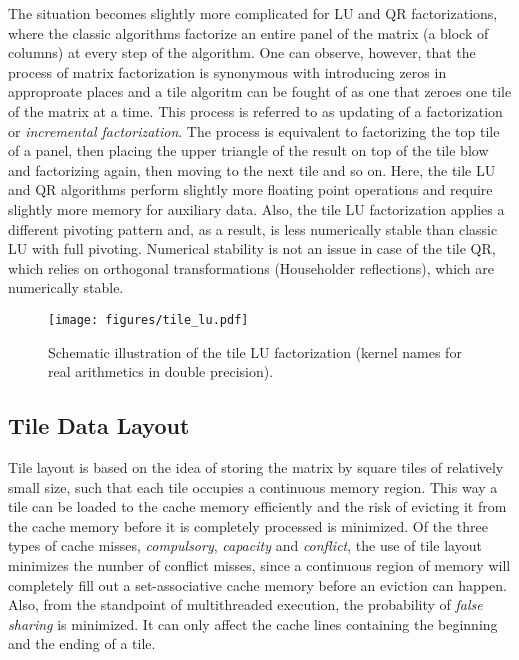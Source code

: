 The situation becomes slightly more complicated for LU and QR factorizations, where the
classic algorithms factorize an entire panel of the matrix (a block of columns) at every
step of the algorithm.
One can observe, however, that the process of matrix factorization is synonymous with introducing
zeros in approproate places and a tile algoritm can be fought of as one that zeroes one tile of
the matrix at a time.
This process is referred to as updating of a factorization or {\em incremental factorization}.
The process is equivalent to factorizing the top tile of a panel, then placing the upper
triangle of the result on top of the tile blow and factorizing again, then moving to the
next tile and so on.
Here, the tile LU and QR algorithms perform slightly more floating point operations and
require slightly more memory for auxiliary data.
Also, the tile LU factorization applies a different pivoting pattern and, as a result,
is less numerically stable than classic LU with full pivoting.
Numerical stability is not an issue in case of the tile QR, which relies on orthogonal
transformations (Householder reflections), which are numerically stable.

\begin{figure}[h!]
\centering
\texttt{[image: figures/tile\_lu.pdf]}
\caption{Schematic illustration of the tile LU factorization
         (kernel names for real arithmetics in double precision).}
\label{fig:tile_lu}
\end{figure}


\subsection{Tile Data Layout}

Tile layout is based on the idea of storing the matrix by square tiles of relatively
small size, such that each tile occupies a continuous memory region.
This way a tile can be loaded to the cache memory efficiently and the risk of evicting it
from the cache memory before it is completely processed is minimized.
Of the three types of cache misses, {\em compulsory}, {\em capacity} and {\em conflict},
the use of tile layout minimizes the number of conflict misses, since a continuous region
of memory will completely fill out a \mbox{set-associative} cache memory before an eviction
can happen.
Also, from the standpoint of multithreaded execution, the probability of {\em false sharing}
is minimized. It can only affect the cache lines containing the beginning and the ending of a tile.

